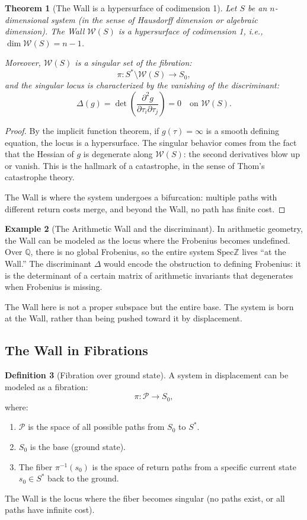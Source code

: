 \documentclass[12pt]{article}
\newtheorem{theorem}{Theorem}[section]
\theoremstyle{definition}
\newtheorem{definition}[theorem]{Definition}
\newtheorem{example}[theorem]{Example}
\theoremstyle{remark}
\newcommand{\Spec}{\mathrm{Spec}}
\begin{document}
\begin{theorem}[The Wall is a hypersurface of codimension 1]
\label{thm:wall-hypersurface}
Let $S$ be an $n$-dimensional system (in the sense of Hausdorff dimension or algebraic dimension). The Wall $\mathcal{W}(S)$ is a hypersurface of codimension 1, i.e., $\dim \mathcal{W}(S) = n - 1$.

Moreover, $\mathcal{W}(S)$ is a singular set of the fibration:
\[
\pi : S^* \setminus \mathcal{W}(S) \to S_0,
\]
and the singular locus is characterized by the vanishing of the discriminant:
\[
\Delta(g) = \det\left(\frac{\partial^2 g}{\partial \tau_i \partial \tau_j}\right) = 0 \quad \text{on } \mathcal{W}(S).
\]
\end{theorem}

\begin{proof}
By the implicit function theorem, if $g(\tau) = \infty$ is a smooth defining equation, the locus is a hypersurface. The singular behavior comes from the fact that the Hessian of $g$ is degenerate along $\mathcal{W}(S)$: the second derivatives blow up or vanish. This is the hallmark of a catastrophe, in the sense of Thom's catastrophe theory.

The Wall is where the system undergoes a bifurcation: multiple paths with different return costs merge, and beyond the Wall, no path has finite cost.
\end{proof}

\begin{example}[The Arithmetic Wall and the discriminant]
In arithmetic geometry, the Wall can be modeled as the locus where the Frobenius becomes undefined. Over $\mathbb{Q}$, there is no global Frobenius, so the entire system $\Spec \mathbb{Z}$ lives ``at the Wall.'' The discriminant $\Delta$ would encode the obstruction to defining Frobenius: it is the determinant of a certain matrix of arithmetic invariants that degenerates when Frobenius is missing.

The Wall here is not a proper subspace but the entire base. The system is born at the Wall, rather than being pushed toward it by displacement.
\end{example}

\subsection{The Wall in Fibrations}

\begin{definition}[Fibration over ground state]
A system in displacement can be modeled as a fibration:
\[
\pi : \mathcal{P} \to S_0,
\]
where:
\begin{enumerate}
\item $\mathcal{P}$ is the space of all possible paths from $S_0$ to $S^*$.
\item $S_0$ is the base (ground state).
\item The fiber $\pi^{-1}(s_0)$ is the space of return paths from a specific current state $s_0 \in S^*$ back to the ground.
\end{enumerate}
The Wall is the locus where the fiber becomes singular (no paths exist, or all paths have infinite cost).
\end{definition}
\end{document}
